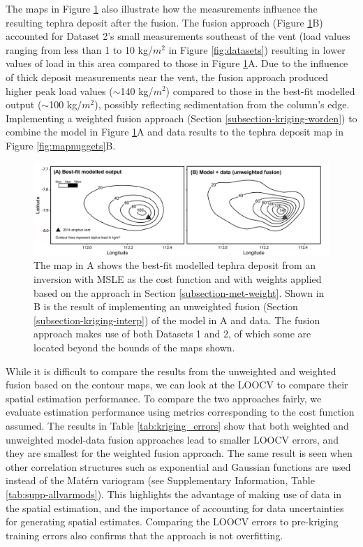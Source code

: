 \documentclass[a4paper,fleqn]{cas-sc}
\begin{document}
The maps in Figure \ref{fig:mapkriged} also illustrate how the measurements influence the resulting tephra deposit after the fusion. The fusion approach (Figure \ref{fig:mapkriged}B) accounted for Dataset 2's small measurements southeast of the vent (load values ranging from less than 1 to 10 kg/$m^2$ in Figure \ref{fig:datasets}) resulting in lower values of load in this area compared to those in Figure \ref{fig:mapkriged}A. Due to the influence of thick deposit measurements near the vent, the fusion approach produced higher peak load values ($\sim$140 kg/$m^2$) compared to those in the best-fit modelled output ($\sim$100 kg/$m^2$), possibly reflecting sedimentation from the column's edge. Implementing a weighted fusion approach (Section \ref{subsection-kriging-worden}) to combine the model in Figure \ref{fig:mapkriged}A and data results to the tephra deposit map in Figure \ref{fig:mapnuggets}B. 

    \begin{figure}[htbp!]
    \centering
    \includegraphics[width=\linewidth]{Figures/fig7_kriging-maps.png}
    \caption{The map in A shows the best-fit modelled tephra deposit from an inversion with MSLE as the cost function and with weights applied based on the approach in Section \ref{subsection-met-weight}. Shown in B is the result of implementing an unweighted fusion (Section \ref{subsection-kriging-interp}) of the model in A and data. The fusion approach makes use of both Datasets 1 and 2, of which some are located beyond the bounds of the maps shown.}
    \label{fig:mapkriged}
    \end{figure}

While it is difficult to compare the results from the unweighted and weighted fusion based on the contour maps, we can look at the LOOCV to compare their spatial estimation performance. To compare the two approaches fairly, we evaluate estimation performance using metrics corresponding to the cost function assumed. The results in Table \ref{tab:kriging_errors} show that both weighted and unweighted model-data fusion approaches lead to smaller LOOCV errors, and they are smallest for the weighted fusion approach. The same result is seen when other correlation structures such as exponential and Gaussian functions are used instead of the Mat\'ern variogram (see Supplementary Information, Table \ref{tab:supp-allvarmods}). This highlights the advantage of making use of data in the spatial estimation, and the importance of accounting for data uncertainties for generating spatial estimates. Comparing the LOOCV errors to pre-kriging training errors also confirms that the approach is not overfitting.
\end{document}
